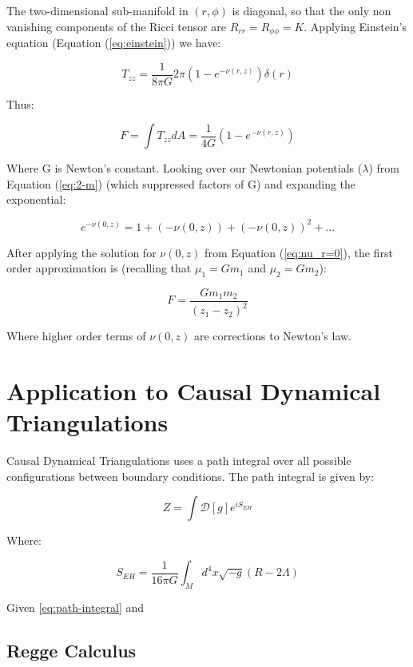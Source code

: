 \documentclass{article}
\begin{document}
The two-dimensional sub-manifold in $\left(r,\phi\right)$ is diagonal, so that the only non vanishing components of the Ricci tensor are $R_{rr}=R_{\phi\phi}=K$. Applying Einstein's equation (Equation (\ref{eq:einstein})) we have:

\begin{equation}
T_{zz}=\frac{1}{8\pi G}2\pi\left(1-e^{-\nu (r,z)}\right)\delta(r)
\end{equation} 

Thus:

\begin{equation}
F=\int T_{zz}dA=\frac{1}{4G}\left(1-e^{-\nu (r,z)}\right)
\end{equation}

Where G is Newton's constant. Looking over our Newtonian potentials ($\lambda$) from Equation (\ref{eq:2-m}) (which suppressed factors of G) and expanding the exponential:

\begin{equation}
e^{-\nu\left(0,z\right)}=1+\left(-\nu\left(0,z\right)\right)+\left(-\nu\left(0,z\right)\right)^{2}+...
\end{equation}

After applying the solution for $\nu(0,z)$ from Equation (\ref{eq:nu_r=0}), the first order approximation is (recalling that $\mu_{1}=Gm_{1}$ and $\mu_{2}=Gm_{2}$):

\begin{equation}
F=\frac{Gm_{1}m_{2}}{\left(z_{1}-z_{2}\right)^{2}}
\end{equation}

Where higher order terms of $\nu\left(0,z\right)$ are corrections to Newton's law.

\section{Application to Causal Dynamical Triangulations}

Causal Dynamical Triangulations uses a path integral over all possible
configurations between boundary conditions. The path integral is given
by:

\begin{equation}
  \label{eq:path-integral}
Z=\int \mathcal{D}[g]e^{iS_ {EH}}
\end{equation}

Where:

\begin{equation}
  \label{eq:einstein-hilbert-action}
  S_{EH}=\frac{1}{16\pi G}\int_{M}d^4 x\sqrt{-g}\left(R-2\Lambda\right)
\end{equation}

Given \eqref{eq:path-integral} and \cite{kommu2011} 

\subsection{Regge Calculus}





\end{document}
